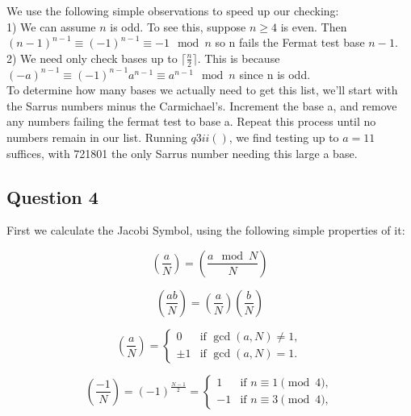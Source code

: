 \documentclass[10pt,a4paper]{report}
\newcommand{\legendre}[2]{(\frac{#1}{#2})}
\begin{document}
We use the following simple observations to speed up our checking:\\

1) We can assume $n$ is odd. To see this, suppose $n\geq4$ is even. Then $(n-1)^{n-1}\equiv (-1)^{n-1}\equiv-1 \mod n$ so n fails the Fermat test base $n-1$.\\

2) We need only check bases up to $\lceil\frac{n}{2}\rceil$. This is because $(-a)^{n-1}\equiv (-1)^{n-1}a^{n-1}\equiv a^{n-1} \mod n$ since n is odd.\\

To determine how many bases we actually need to get this list, we'll start with the Sarrus numbers minus the Carmichael's. Increment the base a, and remove any numbers failing the fermat test to base a. Repeat this process until no numbers remain in our list. Running $q3ii()$, we find testing up to $a=11$ suffices, with 721801 the only Sarrus number needing this large a base.

\subsection*{Question 4}

First we calculate the Jacobi Symbol, using the following simple properties of it:

\begin{equation*}
\legendre{a}{N} = \legendre{a\mod N}{N}
\tag{1}
\end{equation*}

\begin{equation*}
\legendre{ab}{N} = \legendre{a}{N}\legendre{b}{N}
\tag{2}
\end{equation*}

\begin{equation*}
\legendre{a}{N} =
\begin{cases}
0 & \text{if } \gcd(a,N) \ne 1,\\
\pm1 & \text{if } \gcd(a,N) = 1.
\end{cases}
\tag{3}
\end{equation*}

\begin{equation*}
\legendre{-1}{N} = (-1)^{\frac{N-1}{2}} = \begin{cases} 
1 & \text{if }n \equiv 1 \pmod 4,\\
-1 & \text{if }n \equiv 3 \pmod 4,
\end{cases}
\tag{4}
\end{equation*}
\end{document}
